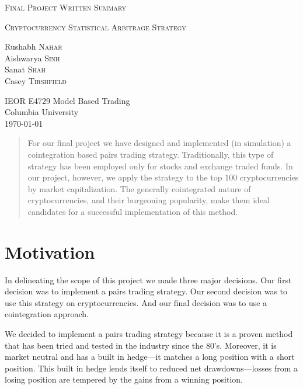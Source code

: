 \documentclass[12pt, letterpaper]{article}
\begin{document}
\begin{titlepage}
	\begin{center}
		\vspace*{.5in}
        
		\Huge
		\textsc{Final Project Written Summary}
        
		\Large
		\textsc{Cryptocurrency Statistical Arbitrage Strategy}
        
		\vfill
		
		\normalsize
		Rushabh \textsc{Nahar} \\
		Aishwarya \textsc{Sinh} \\
		Sanat \textsc{Shah} \\
		Casey \textsc{Tirshfield}
        
		\vfill
		
		IEOR E4729 Model Based Trading \\
		Columbia University \\
		\today
		
		\vspace*{.5in}
        
	\end{center}
\end{titlepage}

\begin{abstract}
\noindent For our final project we have designed and implemented (in simulation) a cointegration based pairs trading strategy. Traditionally, this type of strategy has been employed only for stocks and exchange traded funds. In our project, however, we apply the strategy to the top 100 cryptocurrencies by market capitalization. The generally cointegrated nature of cryptocurrencies, and their burgeoning popularity, make them ideal candidates for a successful implementation of this method.
\end{abstract}

\section{Motivation}
In delineating the scope of this project we made three major decisions. Our first decision was to implement a pairs trading strategy. Our second decision was to use this strategy on cryptocurrencies. And our final decision was to use a cointegration approach.

We decided to implement a pairs trading strategy because it is a proven method that has been tried and tested in the industry since the 80's. Moreover, it is market neutral and has a built in hedge---it matches a long position with a short position. This built in hedge lends itself to reduced net drawdowns---losses from a losing position are tempered by the gains from a winning position.
\end{document}
